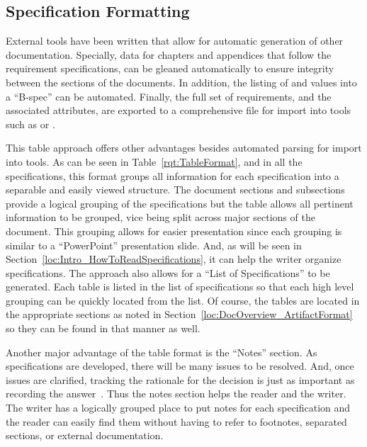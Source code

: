 
\subsection{Specification Formatting}
\label{loc:Intro_SpecFormatting}




External tools have been written that allow for automatic generation of other documentation.
Specially, data for chapters and appendices that follow the requirement specifications, can be gleaned automatically to ensure integrity between the sections of the documents.
In addition, the listing of \KPP and \KSA values into a ``B-spec'' can be automated.
Finally, the full set of requirements, and the associated attributes, are exported to a comprehensive \CSV file for import into \MBSE tools such as \DOORS or \CAMEO.


This table approach offers other advantages besides automated parsing for import into tools.
As can be seen in Table~\ref{rqt:TableFormat}, and in all the specifications, this format groups all information for each specification into a separable and easily viewed structure.
The document sections and subsections provide a logical grouping of the specifications but the table allows all pertinent information to be grouped, vice being split across major sections of the document.
This grouping allows for easier presentation since each grouping is similar to a ``PowerPoint'' presentation slide.
And, as will be seen in Section~\ref{loc:Intro_HowToReadSpecifications}, it can help the writer organize specifications.
The approach also allows for a ``List of Specifications'' to be generated.
Each table is listed in the list of specifications so that each high level grouping can be quickly located from the list.
Of course, the tables are located in the appropriate sections as noted in Section~\ref{loc:DocOverview_ArtifactFormat} so they can be found in that manner as well.


Another major advantage of the table format is the ``Notes'' section.
As specifications are developed, there will be many issues to be resolved.
And, once issues are clarified, tracking the rationale for the decision is just as important as recording the answer~\cite{ref__Brooks_MMM}.
Thus the notes section helps the reader and the writer.
The writer has a logically grouped place to put notes for each specification and the reader can easily find them without having to refer to footnotes, separated sections, or external documentation.

